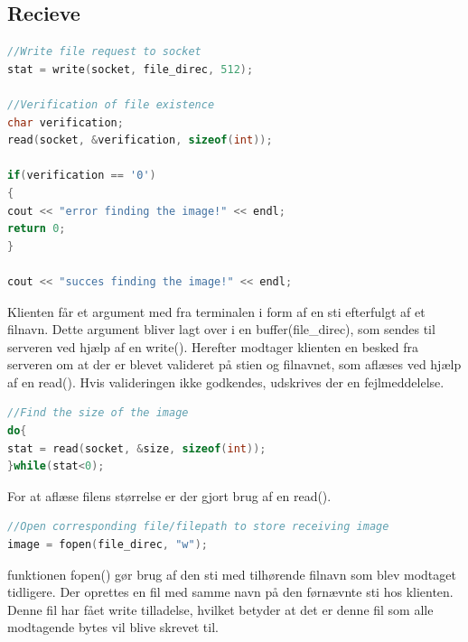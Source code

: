 \documentclass[12pt,fleqn,a4paper]{report}
\begin{document}
\subsection{Recieve}
\begin{framed}
\begin{lstlisting}[language=C++]
//Write file request to socket
stat = write(socket, file_direc, 512);
	
//Verification of file existence
char verification;
read(socket, &verification, sizeof(int));
	
if(verification == '0')
{
cout << "error finding the image!" << endl;
return 0;
}
	
cout << "succes finding the image!" << endl;
\end{lstlisting}
\end{framed}

Klienten får et argument med fra terminalen i form af en sti efterfulgt af et filnavn. Dette argument bliver lagt over i en buffer(file_direc), som sendes til serveren ved hjælp af en write(). 
Herefter modtager klienten en besked fra serveren om at der er blevet valideret på stien og filnavnet, som aflæses ved hjælp af en read(). Hvis valideringen ikke godkendes, udskrives der en fejlmeddelelse.

\begin{framed}
\begin{lstlisting}[language=C++]
//Find the size of the image
do{
stat = read(socket, &size, sizeof(int));
}while(stat<0);
\end{lstlisting}
\end{framed}

For at aflæse filens størrelse er der gjort brug af en read().

\newpage
\begin{framed}
\begin{lstlisting}[language=C++]
//Open corresponding file/filepath to store receiving image
image = fopen(file_direc, "w");
\end{lstlisting}
\end{framed}

 funktionen fopen() gør brug af den sti med tilhørende filnavn som blev modtaget tidligere.
 Der oprettes en fil med samme navn på den førnævnte sti hos klienten. Denne fil har fået write tilladelse, hvilket betyder at det er denne fil som alle modtagende bytes vil blive skrevet til.
\end{document}
